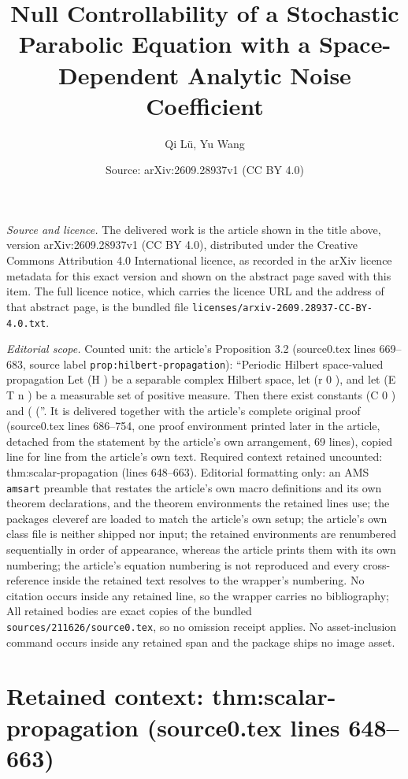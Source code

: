 \documentclass[10pt,a4paper]{amsart}
\title[Null Controllability of a Stochastic Parabolic Equation with a Space-Dependent Analytic Noise Coefficient]{Null Controllability of a Stochastic Parabolic Equation with a Space-Dependent Analytic Noise Coefficient}
\author{Qi L\"u, Yu Wang}
\date{Source: arXiv:2609.28937v1 (CC BY 4.0)}
\theoremstyle{plain}
\theoremstyle{remark}
\theoremstyle{definition}
\theoremstyle{plain}
\begin{document}
\maketitle

\noindent\emph{Source and licence.} The delivered work is the article shown in the title above, version arXiv:2609.28937v1 (CC BY 4.0), distributed under the Creative Commons Attribution 4.0 International licence, as recorded in the arXiv licence metadata for this exact version and shown on the abstract page saved with this item. The full licence notice, which carries the licence URL and the address of that abstract page, is the bundled file \texttt{licenses/arxiv-2609.28937-CC-BY-4.0.txt}.
\par\smallskip

\noindent\textit{Editorial scope.} Counted unit: the article's Proposition 3.2 (source0.tex lines 669--683, source label \texttt{prop:hilbert-propagation}): ``Periodic Hilbert space-valued propagation Let (H ) be a separable complex Hilbert space, let (r 0 ), and let (E T n ) be a measurable set of positive measure. Then there exist constants (C 0 ) and ( (''. It is delivered together with the article's complete original proof (source0.tex lines 686--754, one proof environment printed later in the article, detached from the statement by the article's own arrangement, 69 lines), copied line for line from the article's own text. Required context retained uncounted: thm:scalar-propagation (lines 648--663). Editorial formatting only: an AMS \texttt{amsart} preamble that restates the article's own macro definitions and its own theorem declarations, and the theorem environments the retained lines use; the packages cleveref are loaded to match the article's own setup; the article's own class file is neither shipped nor input; the retained environments are renumbered sequentially in order of appearance, whereas the article prints them with its own numbering; the article's equation numbering is not reproduced and every cross-reference inside the retained text resolves to the wrapper's numbering. No citation occurs inside any retained line, so the wrapper carries no bibliography; All retained bodies are exact copies of the bundled \texttt{sources/211626/source0.tex}, so no omission receipt applies. No asset-inclusion command occurs inside any retained span and the package ships no image asset.


\section*{Retained context: thm:scalar-propagation (source0.tex lines 648--663)}
\end{document}
